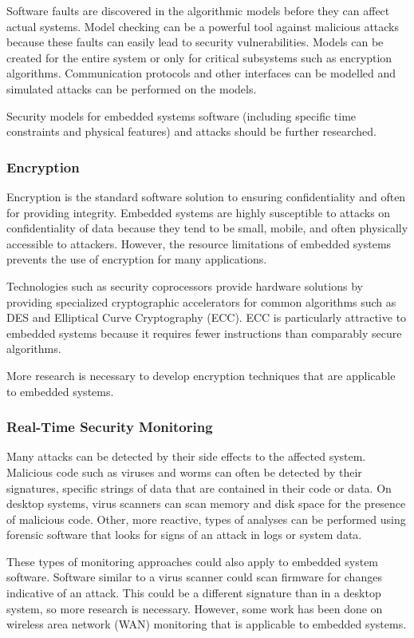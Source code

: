 \documentclass[final,conference,11pt]{IEEEtran}
\begin{document}
Software faults are discovered in the algorithmic models before they can affect actual systems.  Model checking can be a powerful tool against malicious attacks because these faults can easily lead to security vulnerabilities.  Models can be created for the entire system or only for critical subsystems such as encryption algorithms.  Communication protocols and other interfaces can be modelled and simulated attacks can be performed on the models.   \cite{Ouchani2012}

Security models for embedded systems software (including specific time constraints and physical features) and attacks should be further researched.

\subsubsection{Encryption}
Encryption is the standard software solution to ensuring confidentiality and often for providing integrity.  Embedded systems are highly susceptible to attacks on confidentiality of data because they tend to be small, mobile, and often physically accessible to attackers.  However, the resource limitations of embedded systems prevents the use of encryption for many applications. 

Technologies such as security coprocessors provide hardware solutions by providing specialized cryptographic accelerators for common algorithms such as DES and Elliptical Curve Cryptography (ECC).  ECC is particularly attractive to embedded systems because it requires fewer instructions than comparably secure algorithms.  \cite{Huang2010a}

More research is necessary to develop encryption techniques that are applicable to embedded systems.

\subsubsection{Real-Time Security Monitoring}
Many attacks can be detected by their side effects to the affected system.  Malicious code such as viruses and worms can often be detected by their signatures, specific strings of data that are contained in their code or data.  On desktop systems, virus scanners can scan memory and disk space for the presence of malicious code.  Other, more reactive, types of analyses can be performed using forensic software that looks for signs of an attack in logs or system data.  

These types of monitoring approaches could also apply to embedded system software.  Software similar to a virus scanner could scan firmware for changes indicative of an attack.  This could be a different signature than in a desktop system, so more research is necessary.  However, some work has been done on wireless area network (WAN) monitoring that is applicable to embedded systems. \cite{zigbee}
\end{document}

